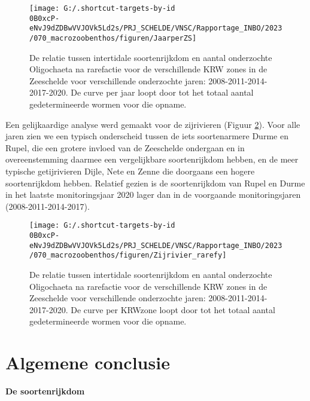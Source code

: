 \documentclass[twoside]{extreport}
\begin{document}
\begin{figure}[H]

{\centering \texttt{[image: G:/.shortcut-targets-by-id\\0B0xcP-eNvJ9dZDBwVVJOVk5Ld2s/PRJ\_SCHELDE/VNSC/Rapportage\_INBO/2023/070\_macrozoobenthos/figuren/JaarperZS]} 

}

\caption{De relatie tussen intertidale soortenrijkdom en aantal onderzochte Oligochaeta na rarefactie voor de verschillende KRW zones in de Zeeschelde voor verschillende onderzochte jaren: 2008-2011-2014-2017-2020. De curve per jaar loopt door tot het totaal aantal gedetermineerde wormen voor die opname.}\label{fig:070-figuur18b}
\end{figure}

Een gelijkaardige analyse werd gemaakt voor de zijrivieren (Figuur
\ref{fig:070-figuur19}). Voor alle jaren zien we een typisch onderscheid
tussen de iets soortenarmere Durme en Rupel, die een grotere invloed van
de Zeeschelde ondergaan en in overeenstemming daarmee een vergelijkbare
soortenrijkdom hebben, en de meer typische getijrivieren Dijle, Nete en
Zenne die doorgaans een hogere soortenrijkdom hebben. Relatief gezien is
de soortenrijkdom van Rupel en Durme in het laatste monitoringsjaar 2020
lager dan in de voorgaande monitoringsjaren (2008-2011-2014-2017).

\begin{figure}[H]

{\centering \texttt{[image: G:/.shortcut-targets-by-id\\0B0xcP-eNvJ9dZDBwVVJOVk5Ld2s/PRJ\_SCHELDE/VNSC/Rapportage\_INBO/2023/070\_macrozoobenthos/figuren/Zijrivier\_rarefy]} 

}

\caption{De relatie tussen intertidale soortenrijkdom en aantal onderzochte Oligochaeta na rarefactie voor de verschillende KRW zones in de Zeeschelde voor verschillende onderzochte jaren: 2008-2011-2014-2017-2020. De curve per KRWzone loopt door tot het totaal aantal gedetermineerde wormen voor die opname.}\label{fig:070-figuur19}
\end{figure}

\hypertarget{algemene-conclusie}{%
\section{Algemene conclusie}\label{algemene-conclusie}}

\textbf{De soortenrijkdom}
\end{document}
